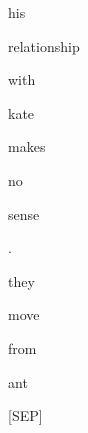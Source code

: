 \documentclass[varwidth=150mm]{standalone}
\begin{document}
\begin{CJK*}{UTF8}{gbsn}
{{{\colorbox{red!5.420969009399414}{\strut his} \colorbox{red!0.0}{\strut relationship} \colorbox{red!0.0}{\strut with} \colorbox{red!2.376891851425171}{\strut kate} \colorbox{red!0.0}{\strut makes} \colorbox{red!2.2248809337615967}{\strut no} \colorbox{red!1.1985362768173218}{\strut sense} \colorbox{red!1.8919055461883545}{\strut .} \colorbox{red!3.3510727882385254}{\strut they} \colorbox{red!0.0}{\strut move} \colorbox{red!5.421247959136963}{\strut from} \colorbox{red!12.189521789550781}{\strut ant} \colorbox{red!1.4893959760665894}{\strut [SEP]}
}}}
\end{CJK*}
\end{document}
